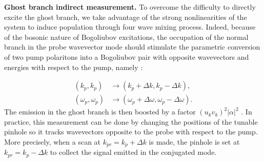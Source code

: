 \bigskip

 \textbf{Ghost branch indirect measurement.} To overcome the difficulty to directly excite the ghost branch, we take advantage of the strong nonlinearities of the system to induce population
 through four wave mixing process. Indeed, because of the bosonic nature of Bogoliubov excitations, the occupation of the normal branch in the probe wavevector mode should stimulate the parametric conversion of two pump polaritons into a Bogoliubov pair with opposite wavevectors and energies with respect to the pump, namely :

 \begin{subequations}
    \begin{align}
    (k_p, k_p) &\rightarrow (k_p+\Delta k, k_p-\Delta k),\\
    (\omega_p, \omega_p) &\rightarrow (\omega_p+\Delta \omega,\omega_p- \Delta \omega).
    \end{align}
 \end{subequations}
The emission in the ghost branch is then boosted by a factor $(u_kv_k)^2|\alpha|^2$ \cite{I_frerot_PRX_2023}. In practice, this measurement
can be done by changing the positions of the tunable pinhole so it tracks wavevectors opposite to the probe with respect to the pump. More precisely,
when a scan at $k_{pr}=k_p+\Delta k$ is made, the pinhole is set at $k_{pr}=k_p-\Delta k$ to collect the signal emitted in the conjugated mode. 

\bigskip

